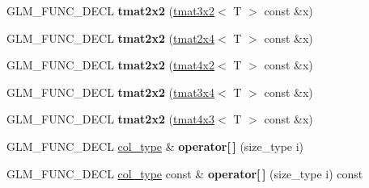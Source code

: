 \begin{DoxyCompactItemize}
\item 
\hypertarget{structglm_1_1detail_1_1tmat2x2_a234059aee97c74e65a145bb715c0111e}{\-G\-L\-M\-\_\-\-F\-U\-N\-C\-\_\-\-D\-E\-C\-L {\bfseries tmat2x2} (\hyperlink{structglm_1_1detail_1_1tmat3x2}{tmat3x2}$<$ \-T $>$ const \&x)}\label{structglm_1_1detail_1_1tmat2x2_a234059aee97c74e65a145bb715c0111e}

\item 
\hypertarget{structglm_1_1detail_1_1tmat2x2_a1219a9df95266dc799fe8a5baef4a7e6}{\-G\-L\-M\-\_\-\-F\-U\-N\-C\-\_\-\-D\-E\-C\-L {\bfseries tmat2x2} (\hyperlink{structglm_1_1detail_1_1tmat2x4}{tmat2x4}$<$ \-T $>$ const \&x)}\label{structglm_1_1detail_1_1tmat2x2_a1219a9df95266dc799fe8a5baef4a7e6}

\item 
\hypertarget{structglm_1_1detail_1_1tmat2x2_af78e67336561256f2b026d48f5a8bdd5}{\-G\-L\-M\-\_\-\-F\-U\-N\-C\-\_\-\-D\-E\-C\-L {\bfseries tmat2x2} (\hyperlink{structglm_1_1detail_1_1tmat4x2}{tmat4x2}$<$ \-T $>$ const \&x)}\label{structglm_1_1detail_1_1tmat2x2_af78e67336561256f2b026d48f5a8bdd5}

\item 
\hypertarget{structglm_1_1detail_1_1tmat2x2_a579557cee38df3588186ed16ea61c8bf}{\-G\-L\-M\-\_\-\-F\-U\-N\-C\-\_\-\-D\-E\-C\-L {\bfseries tmat2x2} (\hyperlink{structglm_1_1detail_1_1tmat3x4}{tmat3x4}$<$ \-T $>$ const \&x)}\label{structglm_1_1detail_1_1tmat2x2_a579557cee38df3588186ed16ea61c8bf}

\item 
\hypertarget{structglm_1_1detail_1_1tmat2x2_a1b8e6c630ddeb39369d9c3562b1a68b9}{\-G\-L\-M\-\_\-\-F\-U\-N\-C\-\_\-\-D\-E\-C\-L {\bfseries tmat2x2} (\hyperlink{structglm_1_1detail_1_1tmat4x3}{tmat4x3}$<$ \-T $>$ const \&x)}\label{structglm_1_1detail_1_1tmat2x2_a1b8e6c630ddeb39369d9c3562b1a68b9}

\item 
\hypertarget{structglm_1_1detail_1_1tmat2x2_af61c5360347e4283bfd682fede74d6e7}{\-G\-L\-M\-\_\-\-F\-U\-N\-C\-\_\-\-D\-E\-C\-L \hyperlink{structglm_1_1detail_1_1tvec2}{col\-\_\-type} \& {\bfseries operator\mbox{[}$\,$\mbox{]}} (size\-\_\-type i)}\label{structglm_1_1detail_1_1tmat2x2_af61c5360347e4283bfd682fede74d6e7}

\item 
\hypertarget{structglm_1_1detail_1_1tmat2x2_a074e61b27b42d0678fbb7edf85483edb}{\-G\-L\-M\-\_\-\-F\-U\-N\-C\-\_\-\-D\-E\-C\-L \hyperlink{structglm_1_1detail_1_1tvec2}{col\-\_\-type} const \& {\bfseries operator\mbox{[}$\,$\mbox{]}} (size\-\_\-type i) const }\label{structglm_1_1detail_1_1tmat2x2_a074e61b27b42d0678fbb7edf85483edb}


\end{DoxyCompactItemize}

